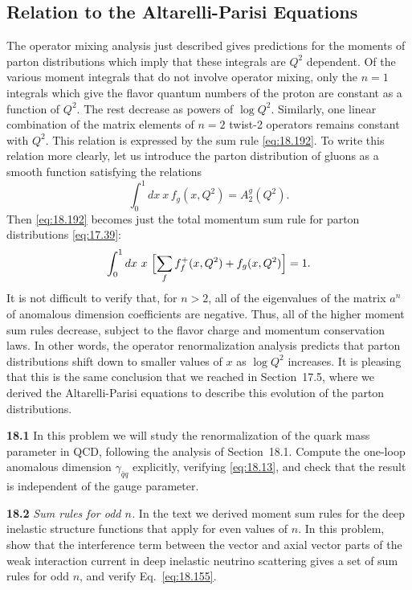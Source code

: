 \subsection{Relation to the Altarelli-Parisi Equations}

The operator mixing analysis just described gives predictions for the moments
of parton distributions which imply that these integrals are $Q^2$ dependent.
Of the various moment integrals that do not involve operator mixing, only
the $n = 1$ integrals which give the flavor quantum numbers of the proton are
constant as a function of $Q^2$.  The rest decrease as powers of $\log Q^2$.
Similarly, one linear combination of the matrix elements of $n = 2$ twist-2
operators remains constant with $Q^2$.  This relation is expressed by the sum
rule \eqref{eq:18.192}.  To write this relation more clearly, let us
introduce the parton distribution of gluons as a smooth function satisfying
the relations
\begin{equation}
  \int_0^1 dx\ x\,f_g(x, Q^2) = A_2^g(Q^2) .
  \label{eq:18.194}
\end{equation}
Then \eqref{eq:18.192} becomes just the total momentum sum rule for parton
distributions \eqref{eq:17.39}:
\begin{equation}
  \int_0^1 dx\ x\ \Bigl[ \sum_f f_f^+(x, Q^2) + f_g(x, Q^2) \Bigr] = 1 .
  \label{eq:18.195}
\end{equation}
It is not difficult to verify that, for $n > 2$, all of the eigenvalues of
the matrix $a^n$ of anomalous dimension coefficients are negative.  Thus, all
of the higher moment sum rules decrease, subject to the flavor charge and
momentum conservation laws.  In other words, the operator renormalization
analysis predicts that parton distributions shift down to smaller values of
$x$ as $\log Q^2$ increases.  It is pleasing that this is the same conclusion
that we reached in Section~17.5, where we derived the Altarelli-Parisi
equations to describe this evolution of the parton distributions.

\problems

\textbf{18.1} In this problem we will study the renormalization of the quark
mass parameter in QCD, following the analysis of Section~18.1.  Compute the
one-loop anomalous dimension $\gamma_{\bar{q}q}$ explicitly, verifying
\eqref{eq:18.13}, and check that the result is independent of the gauge
parameter.

\textbf{18.2} \emph{Sum rules for odd $n$.}  In the text we derived moment
sum rules for the deep inelastic structure functions that apply for even
values of $n$.  In this problem, show that the interference term between the
vector and axial vector parts of the weak interaction current in deep
inelastic neutrino scattering gives a set of sum rules for odd $n$, and
verify Eq.~\eqref{eq:18.155}.

